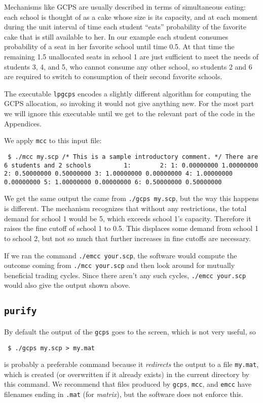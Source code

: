 \documentclass[12pt]{article}
\theoremstyle{definition}
\begin{document}
Mechanisms like GCPS are usually described in terms of simultaneous
eating: each school is thought of as a cake whose size is its
capacity, and at each moment during the unit interval of time each
student ``eats'' probability of the favorite cake that is still
available to her.  In our example each student consumes probability of
a seat in her favorite school until time 0.5.  At that time the
remaining 1.5 unallocated seats in school 1 are just sufficient to
meet the needs of students 3, 4, and 5, who cannot consume any other
school, so students 2 and 6 are required to switch to consumption of
their second favorite schools.

The executable \texttt{lpgcps} encodes a slightly different algorithm
for computing the GCPS allocation, so invoking it would not give
anything new.  For the most part we will ignore this executable until
we get to the relevant part of the code in the Appendices.

We apply \texttt{mcc} to this input file:
\medskip
\begin{obeylines}\texttt{
    \$ ./mcc my.scp 
/* This is a sample introductory comment. */
There are 6 students and 2 schools
 \ \ \ \ \ \ \ \          1: \ \ \ \ \ \ \          2:
1:   0.00000000  1.00000000
2:   0.50000000  0.50000000
3:   1.00000000  0.00000000
4:   1.00000000  0.00000000
5:   1.00000000  0.00000000
6:   0.50000000  0.50000000
}
\end{obeylines} 
\medskip

\noindent
We get the same output the came from \texttt{./gcps my.scp}, but the
way this happens is different.  The mechanism recognizes that without
any restrictions, the total demand for school 1 would be 5, which
exceeds school 1's capacity. Therefore it raises the fine cutoff of
school 1 to 0.5.  This displaces some demand from school 1 to school
2, but not so much that further increases in fine cutoffs are
necessary.

If we ran the command \texttt{./emcc your.scp}, the software would
compute the outcome coming from \texttt{./mcc your.scp} and then look
around for mutually beneficial trading cycles.  Since there aren't any
such cycles, \texttt{./emcc your.scp} would also give the output shown
above.

\subsection{\texttt{purify}} \label{subsec:Implementation} 

By default the output of the \texttt{gcps} goes to the screen, which
is not very useful, so 
\begin{obeylines}
  \texttt{
    \$ ./gcps my.scp > my.mat
    }
\end{obeylines}
\bigskip \noindent is probably a preferable command because it
\emph{redirects} the output to a file \texttt{my.mat}, which is
created (or overwritten if it already exists) in the current directory
by this command.  We recommend that files produced by \texttt{gcps},
\texttt{mcc}, and \texttt{emcc} have filenames ending in \texttt{.mat}
(for \emph{matrix}), but the software does not enforce this.
\end{document}
